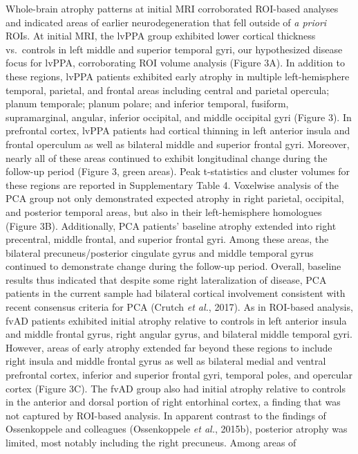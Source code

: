 \documentclass[]{article}
\begin{document}
Whole-brain atrophy patterns at initial MRI corroborated ROI-based
analyses and indicated areas of earlier neurodegeneration that fell
outside of \emph{a priori} ROIs. At initial MRI, the lvPPA group
exhibited lower cortical thickness vs.~controls in left middle and
superior temporal gyri, our hypothesized disease focus for lvPPA,
corroborating ROI volume analysis (Figure 3A). In addition to these
regions, lvPPA patients exhibited early atrophy in multiple
left-hemisphere temporal, parietal, and frontal areas including central
and parietal opercula; planum temporale; planum polare; and inferior
temporal, fusiform, supramarginal, angular, inferior occipital, and
middle occipital gyri (Figure 3). In prefrontal cortex, lvPPA patients
had cortical thinning in left anterior insula and frontal operculum as
well as bilateral middle and superior frontal gyri. Moreover, nearly all
of these areas continued to exhibit longitudinal change during the
follow-up period (Figure 3, green areas). Peak t-statistics and cluster
volumes for these regions are reported in Supplementary Table 4.
Voxelwise analysis of the PCA group not only demonstrated expected
atrophy in right parietal, occipital, and posterior temporal areas, but
also in their left-hemisphere homologues (Figure 3B). Additionally, PCA
patients' baseline atrophy extended into right precentral, middle
frontal, and superior frontal gyri. Among these areas, the bilateral
precuneus/posterior cingulate gyrus and middle temporal gyrus continued
to demonstrate change during the follow-up period. Overall, baseline
results thus indicated that despite some right lateralization of
disease, PCA patients in the current sample had bilateral cortical
involvement consistent with recent consensus criteria for PCA (Crutch
\emph{et al.}, 2017). As in ROI-based analysis, fvAD patients exhibited
initial atrophy relative to controls in left anterior insula and middle
frontal gyrus, right angular gyrus, and bilateral middle temporal gyri.
However, areas of early atrophy extended far beyond these regions to
include right insula and middle frontal gyrus as well as bilateral
medial and ventral prefrontal cortex, inferior and superior frontal
gyri, temporal poles, and opercular cortex (Figure 3C). The fvAD group
also had initial atrophy relative to controls in the anterior and dorsal
portion of right entorhinal cortex, a finding that was not captured by
ROI-based analysis. In apparent contrast to the findings of Ossenkoppele
and colleagues (Ossenkoppele \emph{et al.}, 2015b), posterior atrophy
was limited, most notably including the right precuneus. Among areas of
\end{document}
